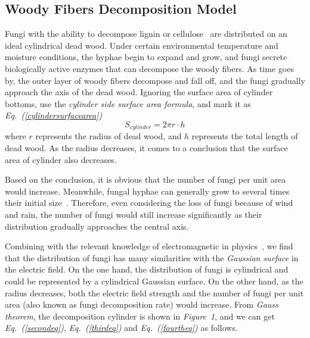\subsection{Woody Fibers Decomposition Model}
Fungi with the ability to decompose lignin or cellulose~\cite{lignin}\cite{cellulose} are distributed on an ideal cylindrical dead wood. Under certain environmental temperature and moisture conditions, the hyphae begin to expand and grow, and fungi secrete biologically active enzymes that can decompose the woody fibers. As time goes by, the outer layer of woody fibers decompose and fall off, and the fungi gradually approach the axis of the dead wood. Ignoring the surface area of cylinder bottoms, use the \textit{cylinder side surface area formula}, and mark it as \textit{Eq.~(\ref{cylindersurfacearea})}
\begin{equation}
  \label{cylindersurfacearea}
  S_{cylinder} = 2\pi r\cdot h
\end{equation}
where $r$ represents the radius of dead wood, and $h$ represents the total length of dead wood. As the radius decreases, it comes to a conclusion that the surface area of cylinder also decreases.
\par
Based on the conclusion, it is obvious that the number of fungi per unit area would increase. Meanwhile, fungal hyphae can generally grow to several times their initial size~\cite{initialsize}. Therefore, even considering the loss of fungi because of wind and rain, the number of fungi would still increase significantly as their distribution gradually approaches the central axis.
\par
Combining with the relevant knowledge of electromagnetic in physics~\cite{physics}, we find that the distribution of fungi has many similarities with the \textit{Gaussian surface} in the electric field. On the one hand, the distribution of fungi is cylindrical and could be represented by a cylindrical Gaussian surface. On the other hand, as the radius decreases, both the electric field strength and the number of fungi per unit area (also known as fungi decomposition rate) would increase. From \textit{Gauss theorem}, the decomposition cylinder is shown in \textit{Figure~1}, and  we can get \textit{Eq.~(\ref{secondeq})}, \textit{Eq.~(\ref{thirdeq})} and \textit{Eq.~(\ref{fourtheq})} as follows.

